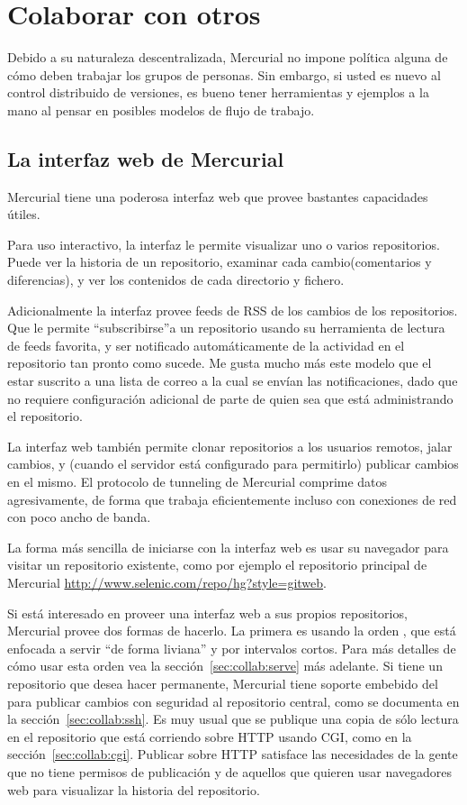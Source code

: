 \chapter{Colaborar con otros}
\label{cha:collab}

Debido a su naturaleza descentralizada, Mercurial no impone política
alguna de cómo deben trabajar los grupos de personas. Sin embargo, si
usted es nuevo al control distribuido de versiones, es bueno tener
herramientas y ejemplos a la mano al pensar en posibles modelos de
flujo de trabajo.

\section{La interfaz web de Mercurial}

Mercurial tiene una poderosa interfaz web que provee bastantes
capacidades útiles.

Para uso interactivo, la interfaz le permite visualizar uno o varios
repositorios. Puede ver la historia de un repositorio, examinar cada
cambio(comentarios y diferencias), y ver los contenidos de cada
directorio y fichero.

Adicionalmente la interfaz provee feeds de RSS de los cambios de los
repositorios. Que le permite ``subscribirse''a un repositorio usando
su herramienta de lectura de feeds favorita, y ser notificado
automáticamente de la actividad en el repositorio tan pronto como
sucede. Me gusta mucho más este modelo que el estar suscrito a una
lista de correo a la cual se envían las notificaciones, dado que no
requiere configuración adicional de parte de quien sea que está
administrando el repositorio.

La interfaz web también permite clonar repositorios a los usuarios
remotos, jalar cambios, y (cuando el servidor está configurado para
permitirlo) publicar cambios en el mismo.  El protocolo de tunneling
de Mercurial comprime datos agresivamente, de forma que trabaja
eficientemente incluso con conexiones de red con poco ancho de banda.

La forma más sencilla de iniciarse con la interfaz web es usar su
navegador para visitar un repositorio existente, como por ejemplo el
repositorio principal de Mercurial \url{http://www.selenic.com/repo/hg?style=gitweb}.

Si está interesado en proveer una interfaz web a sus propios
repositorios, Mercurial provee dos formas de hacerlo.  La primera es
usando la orden , que está enfocada a servir ``de forma
liviana'' y por intervalos cortos.  Para más detalles de cómo usar
esta orden vea la sección~\ref{sec:collab:serve} más adelante. Si
tiene un repositorio que desea hacer permanente, Mercurial tiene
soporte embebido del  para publicar cambios con seguridad
al repositorio central, como se documenta en la
sección~\ref{sec:collab:ssh}.  Es muy usual que se publique una copia
de sólo lectura en el repositorio que está corriendo sobre HTTP usando
CGI, como en la sección~\ref{sec:collab:cgi}.  Publicar sobre HTTP
satisface las necesidades de la gente que no tiene permisos de
publicación y de aquellos que quieren usar navegadores web para
visualizar la historia del repositorio.

